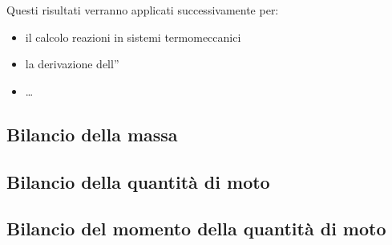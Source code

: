 \documentclass[letterpaper,10pt,italian]{jupyterBook}
\begin{document}
\sphinxAtStartPar
Questi risultati verranno applicati successivamente per:
\begin{itemize}
\item {} 
\sphinxAtStartPar
il calcolo reazioni in sistemi termo\sphinxhyphen{}meccanici

\item {} 
\sphinxAtStartPar
la derivazione dell”{\hyperref[\detokenize{ch/waves/waves-in-physics:physics-hs-waves-equation-examples-fluids-sound}]{}}

\item {} 
\sphinxAtStartPar
…

\end{itemize}


\subsection{Bilancio della massa}
\label{\detokenize{ch/mechanics/dynamics-eom-open:bilancio-della-massa}}\label{\detokenize{ch/mechanics/dynamics-eom-open:physics-hs-mechanics-dynamics-eom-open-mass}}

\subsection{Bilancio della quantità di moto}
\label{\detokenize{ch/mechanics/dynamics-eom-open:bilancio-della-quantita-di-moto}}\label{\detokenize{ch/mechanics/dynamics-eom-open:physics-hs-mechanics-dynamics-eom-open-momentum}}

\subsection{Bilancio del momento della quantità di moto}
\label{\detokenize{ch/mechanics/dynamics-eom-open:bilancio-del-momento-della-quantita-di-moto}}\label{\detokenize{ch/mechanics/dynamics-eom-open:physics-hs-mechanics-dynamics-eom-open-angular-momentum}}
\end{document}
